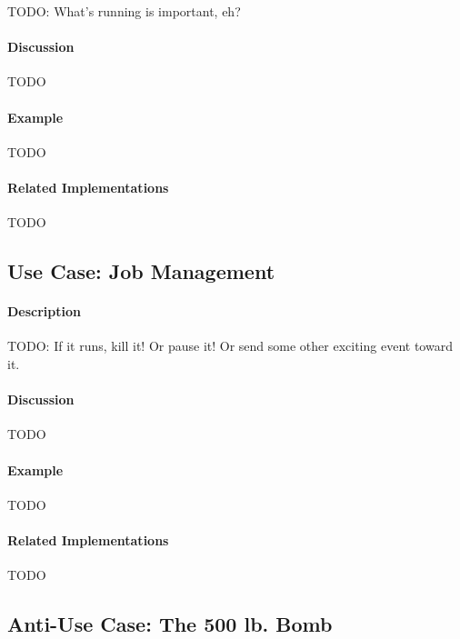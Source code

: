 {\Large TODO:} What's running is important, eh?

\paragraph{Discussion}

{\Large TODO}

\paragraph{Example}

{\Large TODO}

\paragraph{Related Implementations}

{\Large TODO}

\subsection{Use Case: Job Management}

\paragraph{Description}

{\Large TODO:} If it runs, kill it!  Or pause it!  Or send some other exciting event toward it.

\paragraph{Discussion}

{\Large TODO}

\paragraph{Example}

{\Large TODO}

\paragraph{Related Implementations}

{\Large TODO}

\subsection{Anti-Use Case: The 500 lb. Bomb}

